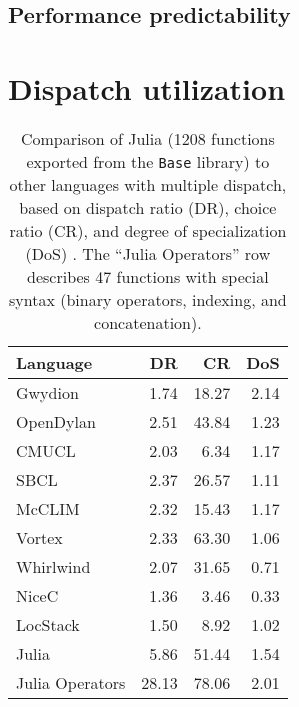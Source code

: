 \iffalse
\subsection{Method changes}
You can always specialize on constants, but you might want to specialize
on the current state of something that changes.
This is really difficult to do.
A system for adding methods as code is loaded provides this.
Method tables can be seen as elaborate mutable hash tables that come with
a protocol for keeping the system consistent under changes.
\fi


\subsection{Performance predictability}


\section{Dispatch utilization}

\begin{table}[!t]
\begin{center}
\begin{tabular}{|l|r|r|r|}\hline
\textbf{Language} & \textbf{DR} & \textbf{CR} & \textbf{DoS} \\
\hline \hline
Gwydion    & 1.74 & 18.27 & 2.14 \\
\hline
OpenDylan  & 2.51 & 43.84 & 1.23 \\
\hline
CMUCL      & 2.03 &  6.34 & 1.17 \\
\hline
SBCL       & 2.37 & 26.57 & 1.11 \\
\hline
McCLIM     & 2.32 & 15.43 & 1.17 \\
\hline
Vortex     & 2.33 & 63.30 & 1.06 \\
\hline
Whirlwind  & 2.07 & 31.65 & 0.71 \\
\hline
NiceC      & 1.36 &  3.46 & 0.33 \\
\hline
LocStack   & 1.50 &  8.92 & 1.02 \\
\hline
Julia      & 5.86 & 51.44 & 1.54 \\
\hline
Julia Operators & 28.13 & 78.06 & 2.01 \\
\hline
\end{tabular}
\end{center}
\caption[Multiple dispatch use statistics]{
\small{
Comparison of Julia (1208 functions exported from the \texttt{Base} library)
to other languages with multiple dispatch, based on dispatch ratio (DR),
choice ratio (CR), and degree of specialization (DoS) \cite{multipledispatch}.
The ``Julia Operators'' row describes 47 functions with special syntax
(binary operators, indexing, and concatenation).
}
}
\label{dispatchratios}
\end{table}

